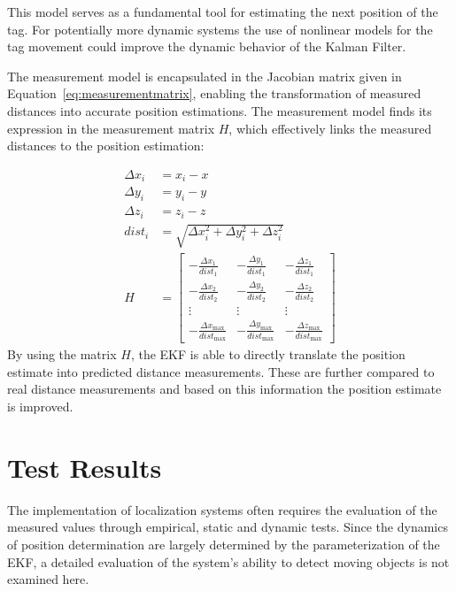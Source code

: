 \documentclass[conference, a4paper]{IEEEtran}
\begin{document}
This model serves as a fundamental tool for estimating the next position of the tag.
For potentially more dynamic systems the use of nonlinear models
for the tag movement could improve the dynamic behavior of the Kalman Filter.

The measurement model is encapsulated in the Jacobian matrix given in Equation~\ref{eq:measurementmatrix},
enabling the transformation of measured distances into accurate position estimations. 
The measurement model finds its expression in the measurement matrix $H$, 
which effectively links the measured distances to the position estimation:

\begin{equation}
	\begin{aligned}
		\Delta x_i &= x_i - x \\
		\Delta y_i &= y_i - y \\
		\Delta z_i &= z_i - z \\
		dist_i &= \sqrt{{\Delta x_i^2 + \Delta y_i^2 + \Delta z_i^2}} \\
		H &= \begin{bmatrix}
			-\frac{{\Delta x_1}}{{dist_1}} & -\frac{{\Delta y_1}}{{dist_1}} & -\frac{{\Delta z_1}}{{dist_1}} \\
			-\frac{{\Delta x_2}}{{dist_2}} & -\frac{{\Delta y_2}}{{dist_2}} & -\frac{{\Delta z_2}}{{dist_2}} \\
			\vdots & \vdots & \vdots \\
			-\frac{{\Delta x_{\text{max}}}}{{dist_{\text{max}}}} & -\frac{{\Delta y_{\text{max}}}}{{dist_{\text{max}}}} & -\frac{{\Delta z_{\text{max}}}}{{dist_{\text{max}}}}
		\end{bmatrix}
	\end{aligned}
	\label{eq:measurementmatrix}
\end{equation}
By using the matrix $H$, the \ac{EKF} is able to directly translate the position estimate into predicted distance measurements.
These are further compared to real distance measurements and based on this information the position estimate is improved.


\section{Test Results}\label{section:tests}
The implementation of localization systems often requires the evaluation of the measured values through empirical,
static and dynamic tests.
Since the dynamics of position determination are largely determined by the parameterization of the \ac{EKF},
a detailed evaluation of the system's ability to detect moving objects is not examined here.
\end{document}
